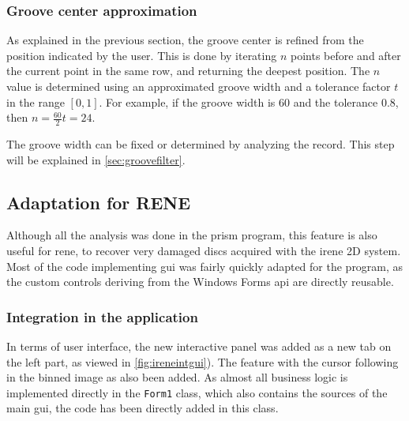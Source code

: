 \subsubsection{Groove center approximation}
\label{sec:centerapprox}

As explained in the previous section, the groove center is refined from the position indicated by the user. This is done by iterating $n$ points before and after the current point in the same row, and returning the deepest position. The $n$ value is determined using an approximated groove width and a tolerance factor $t$ in the range $[0,1]$. For example, if the groove width is $60$ and the tolerance $0.8$, then $n = \frac{60}{2} t = 24$.

The groove width can be fixed or determined by analyzing the record. This step will be explained in \autoref{sec:groovefilter}.

\subsection{Adaptation for RENE}

Although all the analysis was done in the \gls{prism} program, this feature is also useful for \gls{rene}, to recover very damaged discs acquired with the \gls{irene} 2D system. Most of the code implementing \gls{gui} was fairly quickly adapted for the program, as the custom controls deriving from the Windows Forms \gls{api} are directly reusable.

\subsubsection{Integration in the application}

In terms of user interface, the new interactive panel was added as a new tab on the left part, as viewed in \autoref{fig:ireneintgui}). The feature with the cursor following in the binned image as also been added. As almost all business logic is implemented directly in the \texttt{Form1} class, which also contains the sources of the main \gls{gui}, the code has been directly added in this class.

